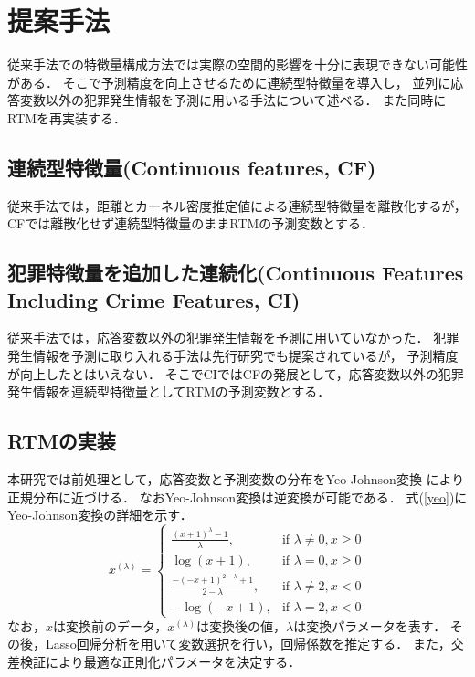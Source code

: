 \section{提案手法}
\label{chapter_3}
従来手法\cite{caplan2015risk}での特徴量構成方法では実際の空間的影響を十分に表現できない可能性がある．
そこで予測精度を向上させるために連続型特徴量を導入し，
並列に応答変数以外の犯罪発生情報を予測に用いる手法について述べる．
また同時にRTM\cite{caplan2015risk}を再実装する．

\subsection{連続型特徴量(Continuous features, CF)}
従来手法\cite{caplan2015risk}では，距離とカーネル密度推定値による連続型特徴量を離散化するが，
CFでは離散化せず連続型特徴量のままRTMの予測変数とする．
\subsection{犯罪特徴量を追加した連続化(Continuous  Features Including Crime Features, CI)}
従来手法\cite{caplan2015risk}では，応答変数以外の犯罪発生情報を予測に用いていなかった．
犯罪発生情報を予測に取り入れる手法は先行研究\cite{大山智也2020日本}でも提案されているが，
予測精度が向上したとはいえない．
そこでCIではCFの発展として，応答変数以外の犯罪発生情報を連続型特徴量としてRTMの予測変数とする．
\subsection{RTMの実装}
本研究では前処理として，応答変数と予測変数の分布をYeo-Johnson変換\cite{weisberg2001yeo}
により正規分布に近づける．
なおYeo-Johnson変換は逆変換が可能である．
式(\ref{yeo})にYeo-Johnson変換の詳細を示す．
\begin{equation}\label{yeo}
   x^{(\lambda)} =
   \begin{cases} 
   \frac{(x+1)^\lambda - 1}{\lambda}, & \text{if } \lambda \neq 0, x \geq 0 \\ 
   \log(x+1), & \text{if } \lambda = 0, x \geq 0 \\ 
   \frac{-(-x+1)^{2-\lambda} + 1}{2-\lambda}, & \text{if } \lambda \neq 2, x < 0 \\ 
   -\log(-x+1), & \text{if } \lambda = 2, x < 0
   \end{cases}
\end{equation}
なお，$x$は変換前のデータ，$x^{(\lambda)}$は変換後の値，$\lambda$は変換パラメータを表す．
その後，Lasso回帰分析を用いて変数選択を行い，回帰係数を推定する．
また，交差検証により最適な正則化パラメータを決定する．

